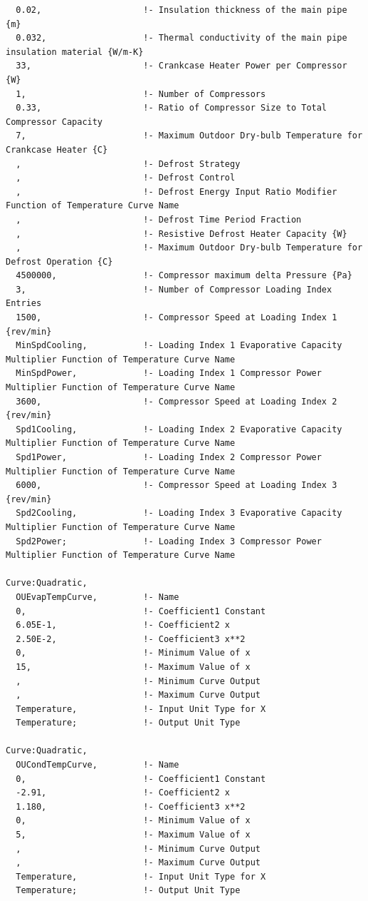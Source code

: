 \begin{lstlisting}
  0.02,                    !- Insulation thickness of the main pipe {m}
  0.032,                   !- Thermal conductivity of the main pipe insulation material {W/m-K}
  33,                      !- Crankcase Heater Power per Compressor {W}
  1,                       !- Number of Compressors
  0.33,                    !- Ratio of Compressor Size to Total Compressor Capacity
  7,                       !- Maximum Outdoor Dry-bulb Temperature for Crankcase Heater {C}
  ,                        !- Defrost Strategy
  ,                        !- Defrost Control
  ,                        !- Defrost Energy Input Ratio Modifier Function of Temperature Curve Name
  ,                        !- Defrost Time Period Fraction
  ,                        !- Resistive Defrost Heater Capacity {W}
  ,                        !- Maximum Outdoor Dry-bulb Temperature for Defrost Operation {C}
  4500000,                 !- Compressor maximum delta Pressure {Pa}
  3,                       !- Number of Compressor Loading Index Entries
  1500,                    !- Compressor Speed at Loading Index 1 {rev/min}
  MinSpdCooling,           !- Loading Index 1 Evaporative Capacity Multiplier Function of Temperature Curve Name
  MinSpdPower,             !- Loading Index 1 Compressor Power Multiplier Function of Temperature Curve Name
  3600,                    !- Compressor Speed at Loading Index 2 {rev/min}
  Spd1Cooling,             !- Loading Index 2 Evaporative Capacity Multiplier Function of Temperature Curve Name
  Spd1Power,               !- Loading Index 2 Compressor Power Multiplier Function of Temperature Curve Name
  6000,                    !- Compressor Speed at Loading Index 3 {rev/min}
  Spd2Cooling,             !- Loading Index 3 Evaporative Capacity Multiplier Function of Temperature Curve Name
  Spd2Power;               !- Loading Index 3 Compressor Power Multiplier Function of Temperature Curve Name

Curve:Quadratic,
  OUEvapTempCurve,         !- Name
  0,                       !- Coefficient1 Constant
  6.05E-1,                 !- Coefficient2 x
  2.50E-2,                 !- Coefficient3 x**2
  0,                       !- Minimum Value of x
  15,                      !- Maximum Value of x
  ,                        !- Minimum Curve Output
  ,                        !- Maximum Curve Output
  Temperature,             !- Input Unit Type for X
  Temperature;             !- Output Unit Type

Curve:Quadratic,
  OUCondTempCurve,         !- Name
  0,                       !- Coefficient1 Constant
  -2.91,                   !- Coefficient2 x
  1.180,                   !- Coefficient3 x**2
  0,                       !- Minimum Value of x
  5,                       !- Maximum Value of x
  ,                        !- Minimum Curve Output
  ,                        !- Maximum Curve Output
  Temperature,             !- Input Unit Type for X
  Temperature;             !- Output Unit Type


\end{lstlisting}
